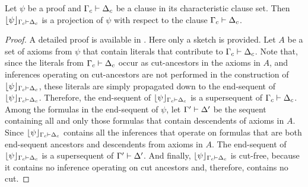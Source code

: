 \begin{theorem}
Let $\psi$ be a proof and $\Gamma_c \vdash \Delta_c$ be a clause in its characteristic clause set. Then $\lfloor \psi \rfloor_{\Gamma_c \vdash \Delta_c}$ is a projection of $\psi$ with respect to the clause $\Gamma_c \vdash \Delta_c$.
\end{theorem}
\begin{proof}
A detailed proof is available in \cite{ToDo}. Here only a sketch is provided. Let $A$ be a set of axioms from $\psi$ that contain literals that contribute to $\Gamma_c \vdash \Delta_c$. Note that, since the literals from $\Gamma_c \vdash \Delta_c$ occur as cut-ancestors in the axioms in $A$, and inferences operating on cut-ancestors are not performed in the construction of $\lfloor \psi \rfloor_{\Gamma_c \vdash \Delta_c}$, these literals are simply propagated down to the end-sequent of $\lfloor \psi \rfloor_{\Gamma_c \vdash \Delta_c}$. Therefore, the end-sequent of $\lfloor \psi \rfloor_{\Gamma_c \vdash \Delta_c}$ is a supersequent of $\Gamma_c \vdash \Delta_c$. Among the formulas in the end-sequent of $\psi$, let $\Gamma' \vdash \Delta'$ be the sequent containing all and only those formulas that contain descendents of axioms in $A$. Since $\lfloor \psi \rfloor_{\Gamma_c \vdash \Delta_c}$ contains all the inferences that operate on formulas that are both end-sequent ancestors and descendents from axioms in $A$. The end-sequent of $\lfloor \psi \rfloor_{\Gamma_c \vdash \Delta_c}$ is a supersequent of $\Gamma' \vdash \Delta'$. And finally, $\lfloor \psi \rfloor_{\Gamma_c \vdash \Delta_c}$ is cut-free, because it contains no inference operating on cut ancestors and, therefore, contains no cut.
\end{proof}



